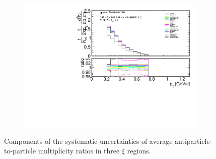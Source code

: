 \begin{figure}[h!]
\begin{subfigure}{.49\textwidth}
			\includegraphics[width=\textwidth,page=39]{chapters/chrgSTAR/img/syst/outPID_SDT_ratio.pdf}
		\end{subfigure}
		\begin{minipage}{.49\textwidth}
			\caption{Components of the systematic uncertainties of average antiparticle-to-particle multiplicity ratios  in three $\xi$ regions. }
			\label{fig:results_star_syst_xi_part}
		\end{minipage}
\end{figure}

